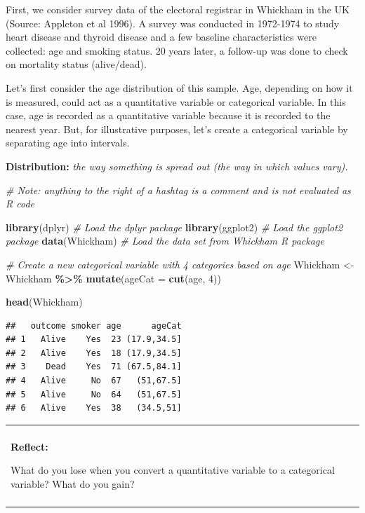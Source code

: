 \documentclass[
]{book}
\newenvironment{Shaded}{\begin{snugshade}}{\end{snugshade}}
\newcommand{\AttributeTok}[1]{\textcolor[rgb]{0.13,0.29,0.53}{#1}}
\newcommand{\CommentTok}[1]{\textcolor[rgb]{0.56,0.35,0.01}{\textit{#1}}}
\newcommand{\DecValTok}[1]{\textcolor[rgb]{0.00,0.00,0.81}{#1}}
\newcommand{\FunctionTok}[1]{\textcolor[rgb]{0.13,0.29,0.53}{\textbf{#1}}}
\newcommand{\NormalTok}[1]{#1}
\newcommand{\OtherTok}[1]{\textcolor[rgb]{0.56,0.35,0.01}{#1}}
\newcommand{\SpecialCharTok}[1]{\textcolor[rgb]{0.81,0.36,0.00}{\textbf{#1}}}
\newenvironment{reflect}
{
    \begin{center}
    
    \begin{tabular}{|p{0.8\textwidth}|}
    \rowcolor{LightBlue}
    \hline\\
    \rowcolor{LightBlue}
    \textbf{Reflect:}
}
{
    \\\rowcolor{LightBlue}
    \\\hline
    \end{tabular} 
    \end{center}
}
\begin{document}
First, we consider survey data of the electoral registrar in Whickham in the UK (Source: Appleton et al 1996). A survey was conducted in 1972-1974 to study heart disease and thyroid disease and a few baseline characteristics were collected: age and smoking status. 20 years later, a follow-up was done to check on mortality status (alive/dead).

Let's first consider the age distribution of this sample. Age, depending on how it is measured, could act as a quantitative variable or categorical variable. In this case, age is recorded as a quantitative variable because it is recorded to the nearest year. But, for illustrative purposes, let's create a categorical variable by separating age into intervals.

\textbf{Distribution:} \emph{the way something is spread out (the way in which values vary).}

\begin{Shaded}
\begin{Highlighting}[]
\CommentTok{\# Note: anything to the right of a hashtag is a comment and is not evaluated as R code}

\FunctionTok{library}\NormalTok{(dplyr) }\CommentTok{\# Load the dplyr package}
\FunctionTok{library}\NormalTok{(ggplot2) }\CommentTok{\# Load the ggplot2 package}
\FunctionTok{data}\NormalTok{(Whickham) }\CommentTok{\# Load the data set from Whickham R package}

\CommentTok{\# Create a new categorical variable with 4 categories based on age}
\NormalTok{Whickham }\OtherTok{\textless{}{-}}\NormalTok{ Whickham }\SpecialCharTok{\%\textgreater{}\%}
    \FunctionTok{mutate}\NormalTok{(}\AttributeTok{ageCat =} \FunctionTok{cut}\NormalTok{(age, }\DecValTok{4}\NormalTok{)) }

\FunctionTok{head}\NormalTok{(Whickham)}
\end{Highlighting}
\end{Shaded}

\begin{verbatim}
##   outcome smoker age      ageCat
## 1   Alive    Yes  23 (17.9,34.5]
## 2   Alive    Yes  18 (17.9,34.5]
## 3    Dead    Yes  71 (67.5,84.1]
## 4   Alive     No  67   (51,67.5]
## 5   Alive     No  64   (51,67.5]
## 6   Alive    Yes  38   (34.5,51]
\end{verbatim}

\begin{reflect}
What do you lose when you convert a quantitative variable to a
categorical variable? What do you gain?
\end{reflect}
\end{document}
